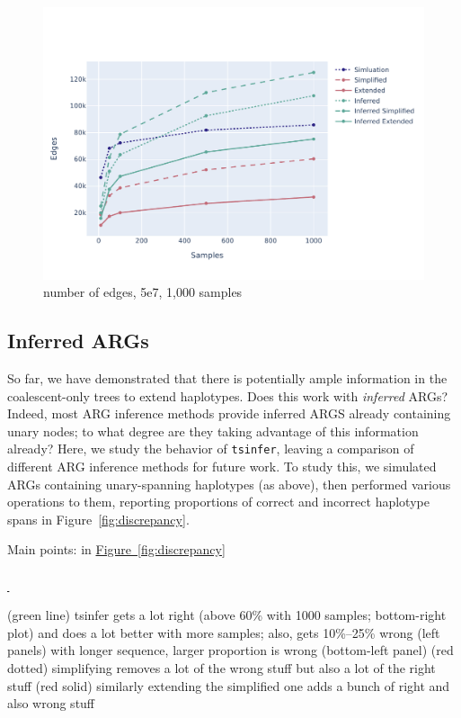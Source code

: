 \documentclass[10pt,twoside,lineno]{gsajnl}
\newcommand{\tsinfer}{\texttt{tsinfer}}
\newcommand*{\figref}[2][]{%
	\hyperref[{#2}]{%
		Figure~\ref*{#2}%
		\ifx\\#1\\%
		\else
		\,#1%
		\fi
	}%
}
\begin{document}
\begin{figure}
	\includegraphics[width=0.9\linewidth]{newplots_wo_ee/edge_counts_5e7.pdf}
    \caption{
        number of edges, 5e7, 1,000 samples
        \label{fig:inferred_edge_counts}
    }
\end{figure}


\subsection{Inferred ARGs}

So far, we have demonstrated that there is potentially ample information
in the coalescent-only trees to extend haplotypes.
Does this work with \emph{inferred} ARGs?
Indeed, most ARG inference methods provide inferred ARGS already containing unary nodes;
to what degree are they taking advantage of this information already?
Here, we study the behavior of \tsinfer{},
leaving a comparison of different ARG inference methods for future work.
To study this, we simulated ARGs containing unary-spanning haplotypes (as above),
then performed various operations to them,
reporting proportions of correct and incorrect haplotype spans in Figure~\ref{fig:discrepancy}.

Main points: in \figref{fig:discrepancy}
(green line) tsinfer gets a lot right (above 60\% with 1000 samples; bottom-right plot)
    and does a lot better with more samples;
    also, gets 10\%--25\% wrong (left panels)
    with longer sequence, larger proportion is wrong (bottom-left panel)
(red dotted)
    simplifying removes a lot of the wrong stuff
    but also a lot of the right stuff
(red solid)
    similarly extending the simplified one adds a bunch of right and also wrong stuff
    
\end{document}
